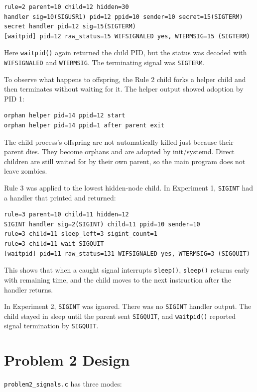 \documentclass[11pt]{article}
\begin{document}
\begin{verbatim}
rule=2 parent=10 child=12 hidden=30
handler sig=10(SIGUSR1) pid=12 ppid=10 sender=10 secret=15(SIGTERM)
secret handler pid=12 sig=15(SIGTERM)
[waitpid] pid=12 raw_status=15 WIFSIGNALED yes, WTERMSIG=15 (SIGTERM)
\end{verbatim}

Here \texttt{waitpid()} again returned the child PID, but the status was decoded with
\texttt{WIFSIGNALED} and \texttt{WTERMSIG}. The terminating signal was
\texttt{SIGTERM}.

To observe what happens to offspring, the Rule 2 child forks a helper child and then
terminates without waiting for it. The helper output showed adoption by PID 1:

\begin{verbatim}
orphan helper pid=14 ppid=12 start
orphan helper pid=14 ppid=1 after parent exit
\end{verbatim}

The child process's offspring are not automatically killed just because their
parent dies. They become orphans and are adopted by init/systemd. Direct children
are still waited for by their own parent, so the main program does not leave zombies.

Rule 3 was applied to the lowest hidden-node child. In Experiment 1, \texttt{SIGINT}
had a handler that printed and returned:

\begin{verbatim}
rule=3 parent=10 child=11 hidden=12
SIGINT handler sig=2(SIGINT) child=11 ppid=10 sender=10
rule=3 child=11 sleep_left=3 sigint_count=1
rule=3 child=11 wait SIGQUIT
[waitpid] pid=11 raw_status=131 WIFSIGNALED yes, WTERMSIG=3 (SIGQUIT)
\end{verbatim}

This shows that when a caught signal interrupts \texttt{sleep()}, \texttt{sleep()}
returns early with remaining time, and the child moves to the next instruction after
the handler returns.

In Experiment 2, \texttt{SIGINT} was ignored. There was no \texttt{SIGINT} handler
output. The child stayed in sleep until the parent sent \texttt{SIGQUIT}, and
\texttt{waitpid()} reported signal termination by \texttt{SIGQUIT}.

\section{Problem 2 Design}

\texttt{problem2\_signals.c} has three modes:
\end{document}
